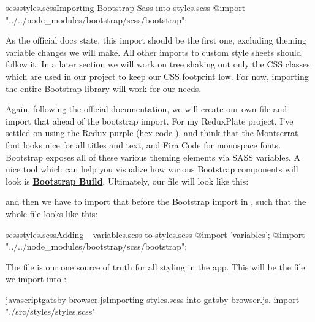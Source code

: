 \documentclass[paper=6in:9in,pagesize=pdftex,headinclude=on,footinclude=on,12pt]{scrbook}
\newcommand{\link}[2]{\textbf{\textcolor{monokaiPink}{\href{#2}{#1}}}}
\begin{document}
\begin{codeInput}{scss}{styles.scss}{Importing Bootstrap Sass into styles.scss}
@import "../../node_modules/bootstrap/scss/bootstrap";
\end{codeInput}

As the official docs state, this import should be the first one, excluding theming variable changes we will make. All other imports to custom style sheets should follow it. In a later section we will work on tree shaking out only the CSS classes which are used in our project to keep our CSS footprint low. For now, importing the entire Bootstrap library will work for our needs.


Again, following the official documentation, we will create our own  file and import that ahead of the bootstrap import. For my ReduxPlate project, I've settled on using the Redux purple (hex code ), and think that the Montserrat font looks nice for all titles and text, and Fira Code for monospace fonts. Bootstrap exposes all of these various theming elements via SASS variables. A nice tool which can help you visualize how various Bootstrap components will look is \link{Bootstrap Build}{https://bootstrap.build/app}. Ultimately, our  file will look like this:


and then we have to import that before the Bootstrap import in , such that the whole file looks like this:

\begin{codeInput}{scss}{styles.scss}{Adding \_variables.scss to styles.scss}
@import 'variables';
@import "../../node_modules/bootstrap/scss/bootstrap";
\end{codeInput}


The  file is our one source of truth for all styling in the app. This will be the file we import into :

\begin{codeInput}{javascript}{gatsby-browser.js}{Importing styles.scss into gatsby-browser.js.}
import "./src/styles/styles.scss"
\end{codeInput}
\end{document}
